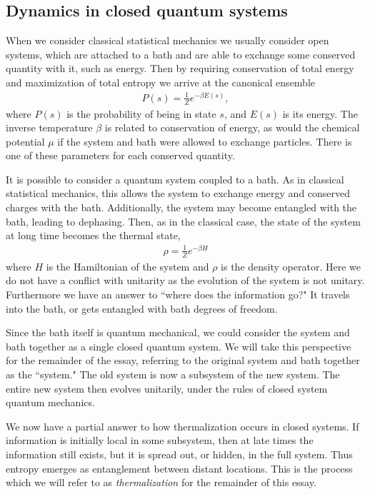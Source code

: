 \documentclass[a4paper,12pt]{article}
\renewcommand{\th}[1]{\frac{1}{#1}}
\newcommand{\note}[1]{{\color{red}{#1}}}
\begin{document}
\note{What is ``ergodic"}

\subsection{Dynamics in closed quantum systems} \label{sub:closed}

When we consider classical statistical mechanics we usually consider open systems, which are attached to a bath and are able to exchange some conserved quantity with it, such as energy. Then by requiring conservation of total energy and maximization of total entropy we arrive at the canonical ensemble
\begin{align}
P(s)=\th{Z}e^{-\beta E(s)},
\end{align}
where $P(s)$ is the probability of being in state $s$, and $E(s)$ is its energy. The inverse temperature $\beta$ is related to conservation of energy, as would the chemical potential $\mu$ if the system and bath were allowed to exchange particles. There is one of these parameters for each conserved quantity.

It is possible to consider a quantum system coupled to a bath. As in classical statistical mechanics, this allows the system to exchange energy and conserved charges with the bath. Additionally, the system may become entangled with the bath, leading to dephasing. Then, as in the classical case, the state of the system at long time becomes the thermal state,
\begin{align}
\rho = \th{Z}e^{-\beta H}
\end{align}
where $H$ is the Hamiltonian of the system and $\rho$ is the density operator.
Here we do not have a conflict with unitarity as the evolution of the system is not unitary. Furthermore we have an answer to ``where does the information go?" It travels into the bath, or gets entangled with bath degrees of freedom. 

Since the bath itself is quantum mechanical, we could consider the system and bath together as a single closed quantum system. We will take this perspective for the remainder of the essay, referring to the original system and bath together as the ``system." The old system is now a subsystem of the new system. The entire new system then evolves unitarily, under the rules of closed system quantum mechanics.

We now have a partial answer to how thermalization occurs in closed systems. If information is initially local in some subsystem, then at late times the information still exists, but it is spread out, or hidden, in the full system. Thus entropy emerges as entanglement between distant locations. This is the process which we will refer to as \emph{thermalization} for the remainder of this essay.
\end{document}
